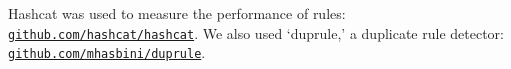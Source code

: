 \documentclass[letterpaper,twocolumn,10pt]{article}
\begin{document}
Hashcat was used to measure the performance of rules:
\texttt{\href{https://github.com/hashcat/hashcat}{github.com/hashcat/hashcat}}.
We also used
`duprule,' a duplicate rule detector:
\texttt{\href{https://github.com/mhasbini/duprule}
{github.com/mhasbini/duprule}}.





\end{document}
